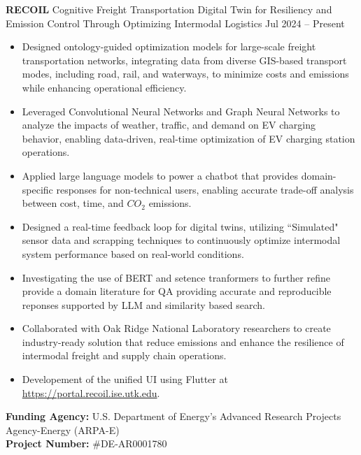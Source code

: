 \documentclass[10pt, letterpaper]{article}
\newenvironment{highlights}{
    \begin{itemize}[
        topsep=0.10 cm,
        parsep=0.10 cm,
        partopsep=0pt,
        itemsep=0pt,
        leftmargin=0 cm + 10pt
    ]
}{
    \end{itemize}
} %
\newenvironment{twocolentry}[2][]{
    \onecolentry
    \def\secondColumn{#2}
    \setcolumnwidth{\fill, 4.5 cm}
    \begin{paracol}{2}
}{
    \switchcolumn \raggedleft \secondColumn
    \end{paracol}
    \endonecolentry
} %
\begin{document}
    \begin{twocolentry}{Jul 2024 – Present} \textbf{RECOIL} \textbar Cognitive Freight Transportation Digital Twin for Resiliency and Emission Control Through Optimizing Intermodal Logistics \end{twocolentry} \begin{highlights} 
        \item Designed ontology-guided optimization models for large-scale freight transportation networks, integrating data from diverse GIS-based transport modes, including road, rail, and waterways, to minimize costs and emissions while enhancing operational efficiency. 
        \item Leveraged Convolutional Neural Networks and Graph Neural Networks to analyze the impacts of weather, traffic, and demand on EV charging behavior, enabling data-driven, real-time optimization of EV charging station operations. 
        \item Applied large language models to power a chatbot that provides domain-specific responses for non-technical users, enabling accurate trade-off analysis between cost, time, and $CO_2$ emissions.
        \item Designed a real-time feedback loop for digital twins, utilizing ``Simulated" sensor data and scrapping techniques to continuously optimize intermodal system performance based on real-world conditions.
        \item Investigating the use of BERT and setence tranformers to further refine provide a domain literature for QA providing accurate and reproducible reponses supported by LLM and similarity based search.
        \item Collaborated with Oak Ridge National Laboratory researchers to create industry-ready solution that reduce emissions and enhance the resilience of intermodal freight and supply chain operations.
        \item Developement of the unified UI using Flutter at \url{https://portal.recoil.ise.utk.edu}.
        
        \end{highlights} \vspace{0.3cm} \noindent \textbf{Funding Agency:} U.S. Department of Energy’s Advanced Research Projects Agency-Energy (ARPA-E)\\  \textbf{Project Number:} \#DE-AR0001780
\end{document}

